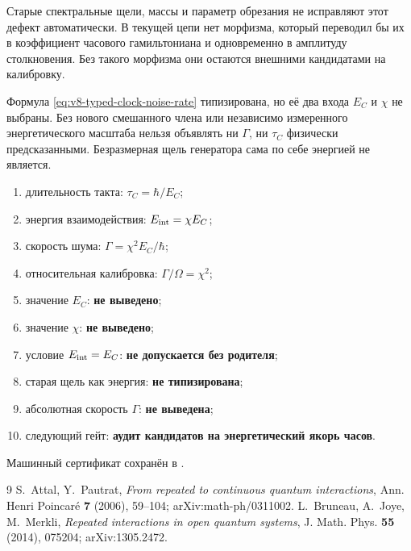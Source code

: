 Старые спектральные щели, массы и параметр обрезания не исправляют этот
дефект автоматически. В текущей цепи нет морфизма, который переводил бы их
в коэффициент часового гамильтониана и одновременно в амплитуду
столкновения. Без такого морфизма они остаются внешними кандидатами на
калибровку.

\begin{nogocriterion}
Формула \eqref{eq:v8-typed-clock-noise-rate} типизирована, но её два входа
$E_C$ и $\chi$ не выбраны. Без нового смешанного члена или независимо
измеренного энергетического масштаба нельзя объявлять ни $\Gamma$, ни
$\tau_C$ физически предсказанными. Безразмерная щель генератора сама по себе
энергией не является.
\end{nogocriterion}

\begin{protocol}
\begin{enumerate}
 \item длительность такта: \textbf{$\tau_C=\hbar/E_C$};
 \item энергия взаимодействия: \textbf{$E_{\rm int}=\chi E_C$};
 \item скорость шума: \textbf{$\Gamma=\chi^2E_C/\hbar$};
 \item относительная калибровка: \textbf{$\Gamma/\Omega=\chi^2$};
 \item значение $E_C$: \textbf{не выведено};
 \item значение $\chi$: \textbf{не выведено};
 \item условие $E_{\rm int}=E_C$: \textbf{не допускается без родителя};
 \item старая щель как энергия: \textbf{не типизирована};
 \item абсолютная скорость $\Gamma$: \textbf{не выведена};
 \item следующий гейт: \textbf{аудит кандидатов на энергетический якорь часов}.
\end{enumerate}
\end{protocol}

Машинный сертификат сохранён в
.

\begin{thebibliography}{9}
S.~Attal, Y.~Pautrat,
\emph{From repeated to continuous quantum interactions},
Ann. Henri Poincar\'e \textbf{7} (2006), 59--104;
arXiv:math-ph/0311002.
L.~Bruneau, A.~Joye, M.~Merkli,
\emph{Repeated interactions in open quantum systems},
J. Math. Phys. \textbf{55} (2014), 075204; arXiv:1305.2472.
\end{thebibliography}